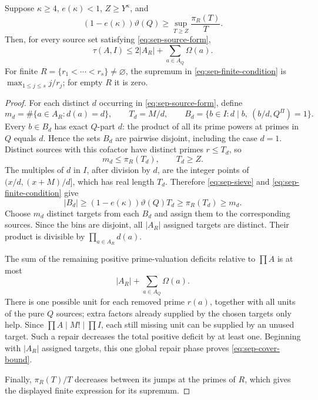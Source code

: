 \begin{proposition}
\label{prop:sep-finite}
Suppose $\kappa\ge4$, $e(\kappa)<1$, $Z\ge Y^\kappa$, and
\begin{equation}
 (1-e(\kappa))\vartheta(Q)
 \ge \sup_{T\ge Z}\frac{\pi_R(T)}T.
 \label{eq:sep-finite-condition}
\end{equation}
Then, for every source set satisfying \eqref{eq:sep-source-form},
\begin{equation}
 \tau(A,I)\le 2|A_R|+\sum_{a\in A_Q}\Omega(a).
 \label{eq:sep-cover-bound}
\end{equation}
For finite $R=\{r_1<\cdots<r_s\}\ne\varnothing$, the supremum in
\eqref{eq:sep-finite-condition} is $\max_{1\le j\le s}j/r_j$; for empty
$R$ it is zero.
\end{proposition}

\begin{proof}
For each distinct $d$ occurring in \eqref{eq:sep-source-form}, define
\[
 m_d=\#\{a\in A_R:d(a)=d\},\qquad T_d=M/d,
 \qquad B_d=\{b\in I:d\mid b,\ (b/d,Q^\Pi)=1\}.
\]
Every $b\in B_d$ has exact $Q$-part $d$: the product of all its prime
powers at primes in $Q$ equals $d$. Hence the sets $B_d$ are pairwise
disjoint, including the case $d=1$. Distinct sources with this cofactor
have distinct primes $r\le T_d$, so
\begin{equation}
 m_d\le\pi_R(T_d),\qquad T_d\ge Z.
 \label{eq:sep-fibre}
\end{equation}
The multiples of $d$ in $I$, after division by $d$, are the integer points
of $(x/d,(x+M)/d]$, which has real length $T_d$. Therefore
\eqref{eq:sep-sieve} and \eqref{eq:sep-finite-condition} give
\[
 |B_d|\ge(1-e(\kappa))\vartheta(Q)T_d
 \ge\pi_R(T_d)\ge m_d.
\]
Choose $m_d$ distinct targets from each $B_d$ and assign them to the
corresponding sources. Since the bins are disjoint, all $|A_R|$ assigned
targets are distinct. Their product is divisible by
$\prod_{a\in A_R}d(a)$.

The sum of the remaining positive prime-valuation deficits relative to
$\prod A$ is at most
\[
 |A_R|+\sum_{a\in A_Q}\Omega(a).
\]
There is one possible unit for each removed prime $r(a)$, together with
all units of the pure $Q$ sources; extra factors already supplied by the
chosen targets only help. Since $\prod A\mid M!\mid\prod I$, each still
missing unit can be supplied by an unused target. Such a repair decreases
the total positive deficit by at least one. Beginning with $|A_R|$ assigned
targets, this one global repair phase proves \eqref{eq:sep-cover-bound}.

Finally, $\pi_R(T)/T$ decreases between its jumps at the primes of $R$,
which gives the displayed finite expression for its supremum.
\end{proof}

